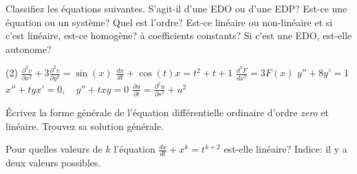 \setcounter{exercise}{100}

\begin{exercise}
	Classifiez les équations suivantes. S'agit-il d'une EDO ou d'une EDP?  Est-ce une équation ou un système?  Quel est l'ordre?  Est-ce linéaire ou non-linéaire et si c'est linéaire, est-ce homogène? à coefficients constants?  Si c'est une EDO, est-elle autonome?
	\begin{tasks}(2)
	\task $\displaystyle \frac{\partial^2 v}{\partial x^2} + 3 \frac{\partial^2 v}{\partial y^2} = \sin(x)$
	\task $\displaystyle \frac{d x}{dt} + \cos(t) x = t^2+t+1$
	\task $\displaystyle \frac{d^7 F}{dx^7} = 3F(x)$
	\task $\displaystyle y''+8y'=1$
	\task $\displaystyle x''+tyx'=0, \quad y''+txy = 0$
	\task $\displaystyle \frac{\partial u}{\partial t} = \frac{\partial^2 u}{\partial s^2} + u^2$
	\end{tasks}
\end{exercise}

\begin{exercise}
	Écrivez la forme générale de l'équation différentielle ordinaire d'ordre \emph{zero} et linéaire.  Trouvez sa solution générale.
\end{exercise}

\begin{exercise}
	Pour quelles valeurs de $k$ l'équation $\frac{dx}{dt}+x^k = t^{k+2}$ est-elle linéaire?  Indice: il y a deux valeurs possibles.
\end{exercise}
